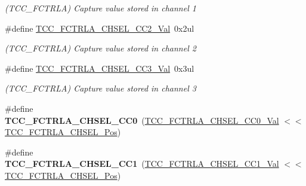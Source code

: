 \begin{DoxyCompactItemize}
\begin{DoxyCompactList}\small\item\em (T\+C\+C\+\_\+\+F\+C\+T\+R\+L\+A) Capture value stored in channel 1 \end{DoxyCompactList}\item 
\hypertarget{group___s_a_m_l21___t_c_c_ga73a57b0de776d728a859c053b5fb2aae}{}\#define \hyperlink{group___s_a_m_l21___t_c_c_ga73a57b0de776d728a859c053b5fb2aae}{T\+C\+C\+\_\+\+F\+C\+T\+R\+L\+A\+\_\+\+C\+H\+S\+E\+L\+\_\+\+C\+C2\+\_\+\+Val}~0x2ul\label{group___s_a_m_l21___t_c_c_ga73a57b0de776d728a859c053b5fb2aae}

\begin{DoxyCompactList}\small\item\em (T\+C\+C\+\_\+\+F\+C\+T\+R\+L\+A) Capture value stored in channel 2 \end{DoxyCompactList}\item 
\hypertarget{group___s_a_m_l21___t_c_c_ga53a6b7146d7216138207ce18c47eaf81}{}\#define \hyperlink{group___s_a_m_l21___t_c_c_ga53a6b7146d7216138207ce18c47eaf81}{T\+C\+C\+\_\+\+F\+C\+T\+R\+L\+A\+\_\+\+C\+H\+S\+E\+L\+\_\+\+C\+C3\+\_\+\+Val}~0x3ul\label{group___s_a_m_l21___t_c_c_ga53a6b7146d7216138207ce18c47eaf81}

\begin{DoxyCompactList}\small\item\em (T\+C\+C\+\_\+\+F\+C\+T\+R\+L\+A) Capture value stored in channel 3 \end{DoxyCompactList}\item 
\hypertarget{group___s_a_m_l21___t_c_c_ga63e4a24bcd49de98475bce9cda699f15}{}\#define {\bfseries T\+C\+C\+\_\+\+F\+C\+T\+R\+L\+A\+\_\+\+C\+H\+S\+E\+L\+\_\+\+C\+C0}~(\hyperlink{group___s_a_m_l21___t_c_c_ga3c20935faff4c001a1c082b4d3200c82}{T\+C\+C\+\_\+\+F\+C\+T\+R\+L\+A\+\_\+\+C\+H\+S\+E\+L\+\_\+\+C\+C0\+\_\+\+Val}      $<$$<$ \hyperlink{group___s_a_m_l21___t_c_c_gaf5d2e7e2fb26fa98fd5d1b9c2bd67caa}{T\+C\+C\+\_\+\+F\+C\+T\+R\+L\+A\+\_\+\+C\+H\+S\+E\+L\+\_\+\+Pos})\label{group___s_a_m_l21___t_c_c_ga63e4a24bcd49de98475bce9cda699f15}

\item 
\hypertarget{group___s_a_m_l21___t_c_c_ga200757cb0d6d05941275bfe530a969c1}{}\#define {\bfseries T\+C\+C\+\_\+\+F\+C\+T\+R\+L\+A\+\_\+\+C\+H\+S\+E\+L\+\_\+\+C\+C1}~(\hyperlink{group___s_a_m_l21___t_c_c_ga632df96067bbd5baef5799cc2b89b3d1}{T\+C\+C\+\_\+\+F\+C\+T\+R\+L\+A\+\_\+\+C\+H\+S\+E\+L\+\_\+\+C\+C1\+\_\+\+Val}      $<$$<$ \hyperlink{group___s_a_m_l21___t_c_c_gaf5d2e7e2fb26fa98fd5d1b9c2bd67caa}{T\+C\+C\+\_\+\+F\+C\+T\+R\+L\+A\+\_\+\+C\+H\+S\+E\+L\+\_\+\+Pos})\label{group___s_a_m_l21___t_c_c_ga200757cb0d6d05941275bfe530a969c1}


\end{DoxyCompactItemize}
